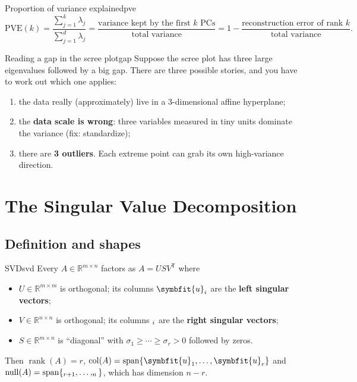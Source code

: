 \documentclass[11pt]{article}
\newcommand{\bm}[1]{\symbfit{#1}}
\newcommand{\R}{\mathbb{R}}
\let\vv\relax\newcommand{\vv}{\bm{v}}
\newcommand{\vu}{\bm{u}}
\newcommand{\T}{^{\mathsf T}}
\newcommand{\rank}{\operatorname{rank}}
\newcommand{\spn}{\operatorname{span}}
\newcommand{\col}{\operatorname{col}}
\begin{document}
\begin{definition}{Proportion of variance explained}{pve}
\[
\text{PVE}(k)=\frac{\sum_{j=1}^k\lambda_j}{\sum_{j=1}^d\lambda_j}
=\frac{\text{variance kept by the first } k\text{ PCs}}{\text{total variance}}
=1-\frac{\text{reconstruction error of rank } k}{\text{total variance}} .
\]
\end{definition}

\begin{example}{Reading a gap in the scree plot}{gap}
Suppose the scree plot has three large eigenvalues followed by a big gap. There are
three possible stories, and you have to work out which one applies:
\begin{enumerate}[nosep]
\item the data really (approximately) live in a 3-dimensional affine hyperplane;
\item the \textbf{data scale is wrong}: three variables measured in tiny units dominate the variance (fix: standardize);
\item there are \textbf{3 outliers}. Each extreme point can grab its own high-variance direction.
\end{enumerate}
\end{example}

\section{The Singular Value Decomposition}\label{sec:svd}

\subsection{Definition and shapes}

\begin{theorem}{SVD}{svd}
Every $A\in\R^{m\times n}$ factors as $A=USV\T$ where
\begin{itemize}[nosep]
\item $U\in\R^{m\times m}$ is orthogonal; its columns $\vu_i$ are the \textbf{left singular vectors};
\item $V\in\R^{n\times n}$ is orthogonal; its columns $\vv_i$ are the \textbf{right singular vectors};
\item $S\in\R^{m\times n}$ is ``diagonal'' with $\sigma_1\ge\cdots\ge\sigma_r>0$ followed by zeros.
\end{itemize}
Then $\rank(A)=r$, $\col(A)=\spn\{\vu_1,\dots,\vu_r\}$ and
$\operatorname{null}(A)=\spn\{\vv_{r+1},\dots,\vv_n\}$, which has dimension $n-r$.
\end{theorem}
\end{document}
